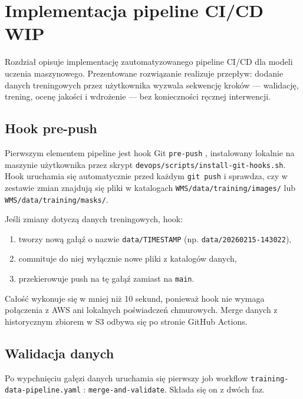 \section{Implementacja pipeline CI/CD WIP}
\label{sec:Implementacja_pipeline}

Rozdział opisuje implementację zautomatyzowanego pipeline CI/CD dla modeli uczenia maszynowego. Prezentowane rozwiązanie realizuje przepływ: dodanie danych treningowych przez użytkownika wyzwala sekwencję kroków --- walidację, trening, ocenę jakości i wdrożenie --- bez konieczności ręcznej interwencji.

\subsection{Hook pre-push}

Pierwszym elementem pipeline jest hook Git \texttt{pre-push} \cite{chacon2014pro_git}, instalowany lokalnie na maszynie użytkownika przez skrypt \texttt{devops/scripts/install-git-hooks.sh}. Hook uruchamia się automatycznie przed każdym \texttt{git push} i sprawdza, czy w zestawie zmian znajdują się pliki w katalogach \texttt{WMS/data/training/images/} lub \texttt{WMS/data/training/masks/}.

Jeśli zmiany dotyczą danych treningowych, hook:
\begin{enumerate}
  \item tworzy nową gałąź o nazwie \texttt{data/TIMESTAMP} (np. \texttt{data/20260215-143022}),
  \item commituje do niej wyłącznie nowe pliki z katalogów danych,
  \item przekierowuje push na tę gałąź zamiast na \texttt{main}.
\end{enumerate}

Całość wykonuje się w mniej niż 10 sekund, ponieważ hook nie wymaga połączenia z AWS ani lokalnych poświadczeń chmurowych. Merge danych z historycznym zbiorem w S3 odbywa się po stronie GitHub Actions.


\subsection{Walidacja danych}

\begin{sloppypar}
Po wypchnięciu gałęzi danych uruchamia się pierwszy job workflow \texttt{training-data-pipeline.yaml} \cite{github_actions_docs}: \texttt{merge-and-validate}. Składa się on z dwóch faz.
\end{sloppypar}

